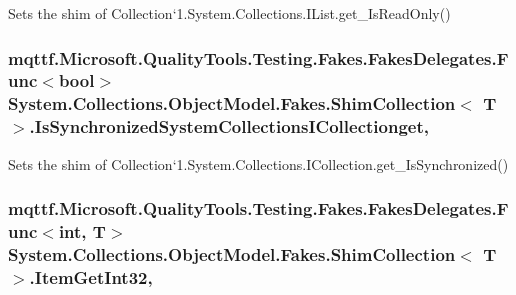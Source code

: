 Sets the shim of Collection`1.System.\-Collections.\-I\-List.\-get\-\_\-\-Is\-Read\-Only()

\hypertarget{class_system_1_1_collections_1_1_object_model_1_1_fakes_1_1_shim_collection_3_01_t_01_4_ad1f2741d85e6085a2b72e7f324a2c19b}{
\subsubsection[{Is\-Synchronized\-System\-Collections\-I\-Collectionget}]{\setlength{\rightskip}{0pt plus 5cm}mqttf.\-Microsoft.\-Quality\-Tools.\-Testing.\-Fakes.\-Fakes\-Delegates.\-Func$<$bool$>$ System.\-Collections.\-Object\-Model.\-Fakes.\-Shim\-Collection$<$ T $>$.Is\-Synchronized\-System\-Collections\-I\-Collectionget\hspace{0.3cm}{\ttfamily [get]}, {\ttfamily [set]}}}\label{class_system_1_1_collections_1_1_object_model_1_1_fakes_1_1_shim_collection_3_01_t_01_4_ad1f2741d85e6085a2b72e7f324a2c19b}


Sets the shim of Collection`1.System.\-Collections.\-I\-Collection.\-get\-\_\-\-Is\-Synchronized()

\hypertarget{class_system_1_1_collections_1_1_object_model_1_1_fakes_1_1_shim_collection_3_01_t_01_4_a348e49baf6d4899c68e67aab49604bf5}{
\subsubsection[{Item\-Get\-Int32}]{\setlength{\rightskip}{0pt plus 5cm}mqttf.\-Microsoft.\-Quality\-Tools.\-Testing.\-Fakes.\-Fakes\-Delegates.\-Func$<$int, T$>$ System.\-Collections.\-Object\-Model.\-Fakes.\-Shim\-Collection$<$ T $>$.Item\-Get\-Int32\hspace{0.3cm}{\ttfamily [get]}, {\ttfamily [set]}}}\label{class_system_1_1_collections_1_1_object_model_1_1_fakes_1_1_shim_collection_3_01_t_01_4_a348e49baf6d4899c68e67aab49604bf5}


